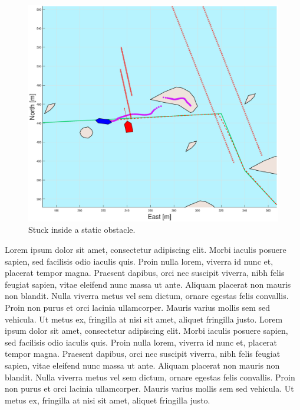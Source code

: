 \clearpage
\begin{figure}[!ht] %
    \centering
    \includegraphics[width=\textwidth]{Images/Figures/Extra_Stuff/w_optstuck}
    \caption{Stuck inside a static obstacle.}
\end{figure}
Lorem ipsum dolor sit amet, consectetur adipiscing elit. Morbi iaculis posuere sapien, sed facilisis odio iaculis quis. 
Proin nulla lorem, viverra id nunc et, placerat tempor magna. Praesent dapibus, orci nec suscipit viverra, nibh felis feugiat sapien, 
vitae eleifend nunc massa ut ante. Aliquam placerat non mauris non blandit. Nulla viverra metus vel sem dictum, ornare egestas felis convallis. 
Proin non purus et orci lacinia ullamcorper. Mauris varius mollis sem sed vehicula. Ut metus ex, fringilla at nisi sit amet, aliquet fringilla justo.
Lorem ipsum dolor sit amet, consectetur adipiscing elit. Morbi iaculis posuere sapien, sed facilisis odio iaculis quis. 
Proin nulla lorem, viverra id nunc et, placerat tempor magna. Praesent dapibus, orci nec suscipit viverra, nibh felis feugiat sapien, 
vitae eleifend nunc massa ut ante. Aliquam placerat non mauris non blandit. Nulla viverra metus vel sem dictum, ornare egestas felis convallis. 
Proin non purus et orci lacinia ullamcorper. Mauris varius mollis sem sed vehicula. Ut metus ex, fringilla at nisi sit amet, aliquet fringilla justo.
\clearpage
